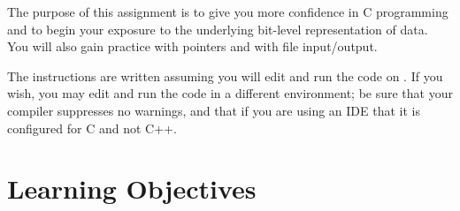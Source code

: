 


\usepackage{graphicx}
\usepackage{caption}
\usepackage{wrapfig}
\usepackage{ulem}
\usepackage{cancel}
\usepackage{multicol}
\captionsetup{width=.8\linewidth}
\makeatletter
\let\orig@lstnumber=\thelstnumber

\newcommand\lstsetnumber[1]{\gdef\thelstnumber{#1}}
\newcommand\lstresetnumber{\global\let\thelstnumber=\orig@lstnumber}
\makeatother

\renewcommand{\labnumber}{\pointerlabnumber}
\renewcommand{\labname}{Pointer Manipulation Lab}
\renewcommand{\shortlabname}{pointerlab}
\renewcommand{\collaborationrules}{\pointerlabcollaboration}
\renewcommand{\duedate}{\pointerlabdue}
\pagelayout

\labidentifier

The purpose of this assignment is to give you more confidence in C programming
and to begin your exposure to the underlying bit-level representation of data.
You will also gain practice with pointers and with file input/output.

The instructions are written assuming you will edit and run the code on
\runtimeenvironment. If you wish, you may edit and run the code
in a different environment; be sure that your compiler suppresses no warnings,
and that if you are using an IDE that it is configured for C and not C++.

\section*{Learning Objectives}

